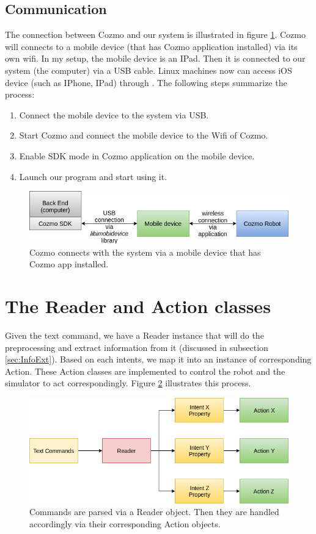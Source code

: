  \subsection{Communication}
The connection between Cozmo and our system is illustrated in figure \ref{fig:CozmoConnect}. Cozmo will connects to a mobile device (that has Cozmo application installed) via its own wifi. In my setup, the mobile device is an IPad. Then it is connected to our system (the computer) via a USB cable. Linux machines now can access iOS device (such as IPhone, IPad) through  \cite{libimobiledevice}. The following steps summarize the process:
\begin{enumerate}
	\item Connect the mobile device to the system via USB.
	\item Start Cozmo and connect the mobile device to the Wifi of Cozmo.
	\item Enable SDK mode in Cozmo application on the mobile device.
	\item Launch our program and start using it.
\end{enumerate}
\begin{figure}[!htb]
	\centering
	\includegraphics[width=0.9\hsize]{./figures/CozmoConnect}
	\caption{Cozmo connects with the system via a mobile device that has Cozmo app installed.}
	\label{fig:CozmoConnect}
\end{figure}

\section{The Reader and Action classes}
Given the text command, we have a Reader instance that will do the preprocessing and extract information from it (discussed in subsection \ref{sec:InfoExt}). Based on each intents, we map it into an instance of corresponding Action. These Action classes are implemented to control the robot and the simulator to act correspondingly. Figure \ref{fig:readerAction} illustrates this process. 

\begin{figure}[!htb]
	\centering
	\includegraphics[width=0.9\hsize]{./figures/readerAction}
	\caption{Commands are parsed via a Reader object. Then they are handled accordingly via their corresponding Action objects.}
	\label{fig:readerAction}
\end{figure}

